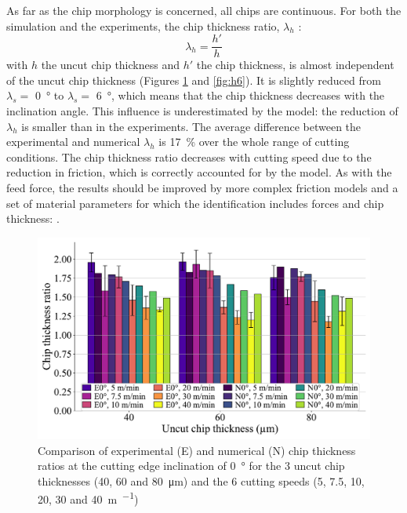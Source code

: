 \documentclass[preprint,12pt,times]{elsarticle}
\begin{document}
As far as the chip morphology is concerned, all chips are continuous. For both the simulation and the experiments, the chip thickness ratio, $\lambda_h$ :
%
\begin{equation}
\lambda_h = \frac{h'}{h}
\end{equation}
%
with $h$ the uncut chip thickness and $h'$ the chip thickness, is almost independent of the uncut chip thickness (Figures \ref{fig:h0} and \ref{fig:h6}). It is slightly reduced from $\lambda_s =$ \qty{0}{\degree} to $\lambda_s =$ \qty{6}{\degree}, which means that the chip thickness decreases with the inclination angle. This influence is underestimated by the model: the reduction of $\lambda_h$ is smaller than in the experiments. The average difference between the experimental and numerical $\lambda_h$ is \qty{17}{\%} over the whole range of cutting conditions. The chip thickness ratio decreases with cutting speed due to the reduction in friction, which is correctly accounted for by the model. As with the feed force, the results should be improved by more complex friction models and a set of material parameters for which the identification includes forces and chip thickness: \cite{kugalurpalanisamy_Identification_2022}.

\begin{figure}[!h]
\centering
\includegraphics[width = 140 mm]{Figures/h0}
\caption{Comparison of experimental (E) and numerical (N) chip thickness ratios at the cutting edge inclination of \qty{0}{\degree} for the 3 uncut chip thicknesses (40, 60 and \qty{80}{\um}) and the 6 cutting speeds (5, 7.5, 10, 20, 30 and \qty{40}{\m\per\min})}
\label{fig:h0}
\end{figure}
\end{document}
